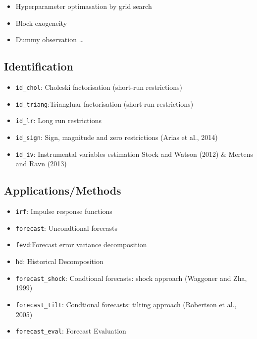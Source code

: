 \documentclass[
]{article}
\providecommand{\tightlist}{%
  \setlength{\itemsep}{0pt}\setlength{\parskip}{0pt}}
\begin{document}
\begin{itemize}
\tightlist
\item
  Hyperparameter optimasation by grid search
\item
  Block exogeneity
\item
  Dummy observation \ldots{}
\end{itemize}

\hypertarget{identification}{%
\subsection{Identification}\label{identification}}

\begin{itemize}
\tightlist
\item
  \texttt{id\_chol}: Choleski factorisation (short-run restrictions)
\item
  \texttt{id\_triang}:Triangluar factorisation (short-run restrictions)
\item
  \texttt{id\_lr}: Long run restrictions
\item
  \texttt{id\_sign}: Sign, magnitude and zero restrictions (Arias et al., 2014)
\item
  \texttt{id\_iv}: Instrumental variables estimation Stock and Watson (2012) \& Mertens and Ravn (2013)
\end{itemize}

\hypertarget{applicationsmethods}{%
\subsection{Applications/Methods}\label{applicationsmethods}}

\begin{itemize}
\item
  \texttt{irf}: Impulse response functions
\item
  \texttt{forecast}: Uncondtional forecasts
\item
  \texttt{fevd}:Forecast error variance decomposition
\item
  \texttt{hd}: Historical Decomposition
\item
  \texttt{forecast\_shock}: Condtional forecasts: shock approach (Waggoner and Zha, 1999)
\item
  \texttt{forecast\_tilt}: Condtional forecasts: tilting approach (Robertson et al., 2005)
\item
  \texttt{forecast\_eval}: Forecast Evaluation
\end{itemize}
\end{document}
